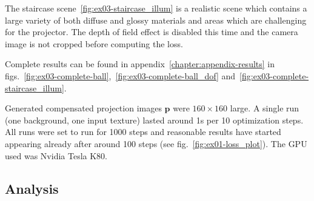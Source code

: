 The staircase scene~\ref{fig:ex03-staircase_illum} is a realistic scene which contains a large variety of both diffuse and glossy materials and areas which are challenging for the projector. The depth of field effect is disabled this time and the camera image is not cropped before computing the loss.

Complete results can be found in appendix~\ref{chapter:appendix-results} in figs.~\ref{fig:ex03-complete-ball},~\ref{fig:ex03-complete-ball_dof} and~\ref{fig:ex03-complete-staircase_illum}.

Generated compensated projection images \(\bm{p}\) were \(160 \times 160\) large. A single run (one background, one input texture) lasted around 1s per 10 optimization steps. All runs were set to run for 1000 steps and reasonable results have started appearing already after around 100 steps (see fig.~\ref{fig:ex01-loss_plot}). The GPU used was Nvidia Tesla K80.

\subsection{Analysis}
\label{section:results-experiments-03-analysis}

